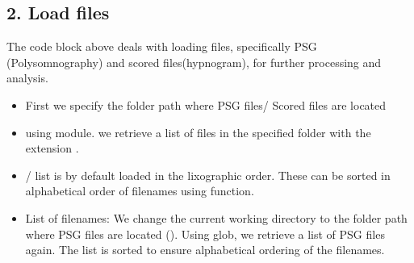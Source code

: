 \documentclass[letterpaper,10pt,english]{sphinxmanual}
\begin{document}
\begin{sphinxVerbatim}[commandchars=\\\{\}]

   
 
 
   
   
   
   
   
 
   
   
\end{sphinxVerbatim}


\subsection{2. Load files}
\label{\detokenize{code:load-files}}
\sphinxAtStartPar
The code block above deals with loading files, specifically PSG (Polysomnography) and scored files(hypnogram), for further processing and analysis.
\begin{itemize}
\item {} 
\sphinxAtStartPar
First we specify the folder path where PSG files/ Scored files are located

\item {} 
\sphinxAtStartPar
using  module. we retrieve a list of files in the specified folder with the extension .

\item {} 
\sphinxAtStartPar
{} /   list is by default loaded in the lixographic order. These can be sorted in alphabetical order of filenames using  function.

\item {} 
\sphinxAtStartPar
List of filenames: We change the current working directory to the folder path where PSG files are located (). Using glob, we retrieve a list of PSG files again. The  list is sorted to ensure alphabetical ordering of the filenames.

\end{itemize}
\end{document}
